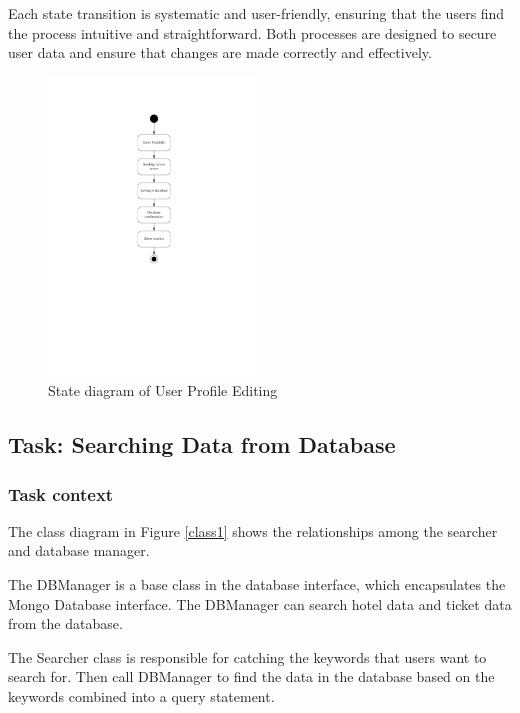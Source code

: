 \documentclass[conference]{IEEEtran}
\begin{document}
Each state transition is systematic and user-friendly, ensuring that the users find the process intuitive and straightforward. Both processes are designed to secure user data and ensure that changes are made correctly and effectively.
\begin{figure}[htbp]
	\centerline{\includegraphics[width=0.5\textwidth]{Diagram_of_Editing_Info_and_Password/State_diagram_of_editing_info.pdf}}
	\caption{State diagram of  User Profile Editing}
	\label{State_diagram_of_editing_info}
\end{figure}


\subsection{\textbf{Task: Searching Data from Database }}


\subsubsection{\textbf{Task context }}

\textbf{}

The class diagram in Figure \ref{class1} shows the relationships among the searcher and database manager. 

The DBManager is a base class in the database interface, which encapsulates the Mongo Database interface. The DBManager can search hotel data and ticket data from the database.

The Searcher class is responsible for catching the keywords that users want to search for. Then call DBManager to find the data in the database based on the keywords combined into a query statement.
\end{document}
